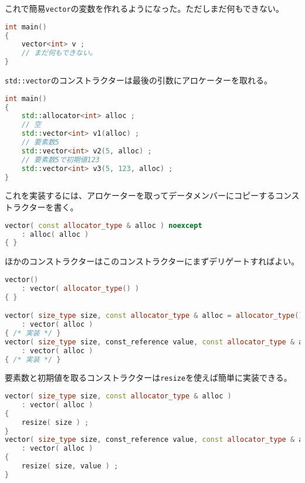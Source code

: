 これで簡易\texttt{vector}の変数を作れるようになった。ただしまだ何もできない。

\begin{lstlisting}[language={C++}]
int main()
{
    vector<int> v ;
    // まだ何もできない。
}
\end{lstlisting}


\texttt{std::vector}のコンストラクターは最後の引数にアロケーターを取れる。

\begin{lstlisting}[language={C++}]
int main()
{
    std::allocator<int> alloc ;
    // 空
    std::vector<int> v1(alloc) ;
    // 要素数5
    std::vector<int> v2(5, alloc) ;
    // 要素数5で初期値123
    std::vector<int> v3(5, 123, alloc) ;
}
\end{lstlisting}

これを実装するには、アロケーターを取ってデータメンバーにコピーするコンストラクターを書く。

\begin{lstlisting}[language={C++}]
vector( const allocator_type & alloc ) noexcept
    : alloc( alloc )
{ }
\end{lstlisting}

ほかのコンストラクターはこのコンストラクターにまずデリゲートすればよい。

\begin{lstlisting}[language={C++}]
vector()
    : vector( allocator_type() )
{ }

vector( size_type size, const allocator_type & alloc = allocator_type() )
    : vector( alloc )
{ /* 実装 */ }
vector( size_type size, const_reference value, const allocator_type & alloc = allocator_type() )
    : vector( alloc )
{ /* 実装 */ }
\end{lstlisting}


要素数と初期値を取るコンストラクターは\texttt{resize}を使えば簡単に実装できる。

\begin{lstlisting}[language={C++}]
vector( size_type size, const allocator_type & alloc )
    : vector( alloc )
{
    resize( size ) ;
}
vector( size_type size, const_reference value, const allocator_type & alloc )
    : vector( alloc )
{
    resize( size, value ) ;
}
\end{lstlisting}

